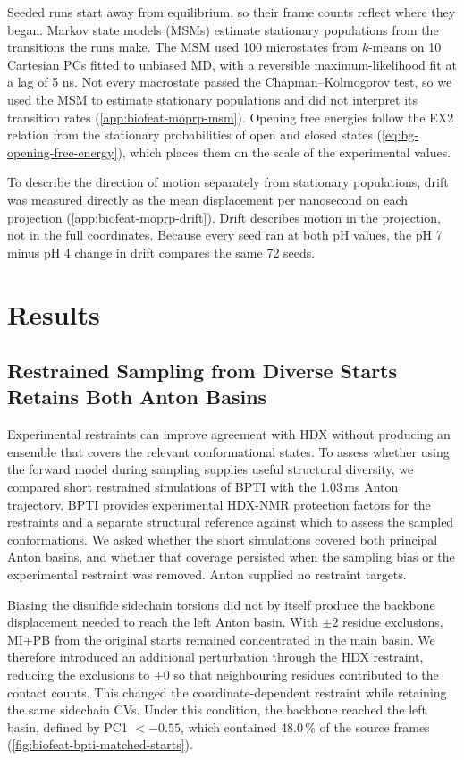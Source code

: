 Seeded runs start away from equilibrium, so their frame counts reflect where they began. Markov state models (MSMs) estimate stationary populations from the transitions the runs make.\supercite{prinzMarkovModelsMolecular2011} The MSM used 100 microstates from $k$-means on 10 Cartesian PCs fitted to unbiased MD, with a reversible maximum-likelihood fit at a lag of 5 ns. Not every macrostate passed the Chapman--Kolmogorov test, so we used the MSM to estimate stationary populations and did not interpret its transition rates (\cref{app:biofeat-moprp-msm}). Opening free energies follow the EX2 relation from the stationary probabilities of open and closed states (\cref{eq:bg-opening-free-energy}), which places them on the scale of the experimental values.

To describe the direction of motion separately from stationary populations, drift was measured directly as the mean displacement per nanosecond on each projection (\cref{app:biofeat-moprp-drift}). Drift describes motion in the projection, not in the full coordinates. Because every seed ran at both pH values, the pH 7 minus pH 4 change in drift compares the same 72 seeds.

\section{Results}
\label{sec:biofeat-results}

\subsection{Restrained Sampling from Diverse Starts Retains Both Anton Basins}
\label{sec:biofeat-bpti-results}

Experimental restraints can improve agreement with HDX without producing an ensemble that covers the relevant conformational states. To assess whether using the forward model during sampling supplies useful structural diversity, we compared short restrained simulations of BPTI with the 1.03\,ms Anton trajectory. BPTI provides experimental HDX-NMR protection factors for the restraints and a separate structural reference against which to assess the sampled conformations. We asked whether the short simulations covered both principal Anton basins, and whether that coverage persisted when the sampling bias or the experimental restraint was removed. Anton supplied no restraint targets.

Biasing the disulfide sidechain torsions did not by itself produce the backbone displacement needed to reach the left Anton basin. With $\pm2$ residue exclusions, MI+PB from the original starts remained concentrated in the main basin. We therefore introduced an additional perturbation through the HDX restraint, reducing the exclusions to $\pm0$ so that neighbouring residues contributed to the contact counts. This changed the coordinate-dependent restraint while retaining the same sidechain CVs. Under this condition, the backbone reached the left basin, defined by PC1 $<-0.55$, which contained 48.0\,\% of the source frames (\cref{fig:biofeat-bpti-matched-starts}).

